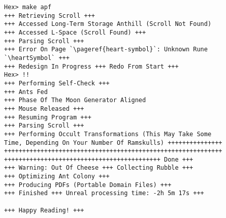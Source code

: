 \begin{lrbox}{\preambleBox}%
\begin{lstlisting}
Hex> make apf
+++ Retrieving Scroll +++
+++ Accessed Long-Term Storage Anthill (Scroll Not Found)
+++ Accessed L-Space (Scroll Found) +++
+++ Parsing Scroll +++
+++ Error On Page `\pageref{heart-symbol}`: Unknown Rune `\heartSymbol` +++
+++ Redesign In Progress +++ Redo From Start +++
Hex> !!
+++ Performing Self-Check +++
+++ Ants Fed
+++ Phase Of The Moon Generator Aligned
+++ Mouse Released +++
+++ Resuming Program +++
+++ Parsing Scroll +++
+++ Performing Occult Transformations (This May Take Some
Time, Depending On Your Number Of Ramskulls) +++++++++++++++
++++++++++++++++++++++++++++++++++++++++++++++++++++++++++++
+++++++++++++++++++++++++++++++++++++++++++ Done +++
+++ Warning: Out Of Cheese +++ Collecting Rubble +++
+++ Optimizing Ant Colony +++
+++ Producing PDFs (Portable Domain Files) +++
+++ Finished +++ Unreal processing time: -2h 5m 17s +++

+++ Happy Reading! +++
\end{lstlisting}
\end{lrbox}
